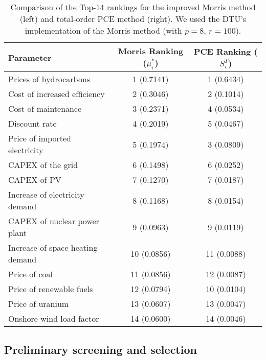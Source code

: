 \begin{table}[htbp]
	\caption{Comparison of the Top-14 rankings for the improved Morris method (left) and total-order \gls{PCE} method (right). We used the DTU's implementation of the Morris method \cite{MorrisCodeDTU} (with $p=8$, $r=100$). }
    \label{tab:GSA:Comparison}
    \centering
    \begin{tabular}{lcc}
    \toprule
		\textbf{Parameter} & \textbf{Morris Ranking} ($\mu^*_{i}$) & \textbf{PCE Ranking} ($S_i^T$) \\
        \midrule
        Prices of hydrocarbons & 1 (0.7141) & 1 (0.6434) \\
        Cost of increased efficiency & 2 (0.3046) & 2 (0.1014) \\
        Cost of maintenance & 3 (0.2371) & 4 (0.0534) \\
        Discount rate & 4 (0.2019) & 5 (0.0467) \\
        Price of imported electricity & 5 (0.1974) & 3 (0.0809) \\
        CAPEX of the grid & 6 (0.1498) & 6 (0.0252) \\
        CAPEX of PV & 7 (0.1270) & 7 (0.0187) \\
        Increase of electricity demand & 8 (0.1168) & 8 (0.0154) \\
        CAPEX of nuclear power plant & 9 (0.0963) & 9 (0.0119) \\
        Increase of space heating demand & 10 (0.0856) & 11 (0.0088) \\
        Price of coal & 11 (0.0856) & 12 (0.0087)\\
        Price of renewable fuels & 12 (0.0794) & 10 (0.0104)\\
        Price of uranium & 13 (0.0607) & 13 (0.0047)\\
        Onshore wind load factor & 14 (0.0600) & 14 (0.0046)\\
       \bottomrule
    \end{tabular}
\end{table}

\subsection{Preliminary screening and selection}
\label{subsec:screening}

